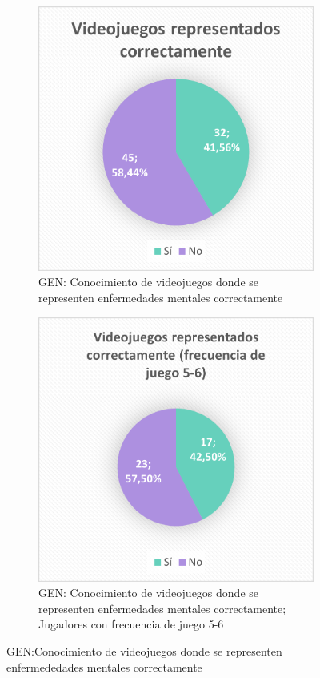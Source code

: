 \documentclass[12pt, a4paper,twoside,titlepage]{book}
\begin{document}
\begin{figure}
	\centering
	\begin{subfigure}{.5\textwidth}
		\centering
		\includegraphics[width=.95\linewidth]{ANEXO Gen/17AnexGENCorr}
		\caption{GEN: Conocimiento de videojuegos donde se representen enfermedades mentales correctamente}
		
	\end{subfigure}%
	\begin{subfigure}{.5\textwidth}
		\centering
		\includegraphics[width=.95\linewidth]{ANEXO Gen/18AnexGENCorr56}
		\caption{GEN: Conocimiento de videojuegos donde se representen enfermedades mentales correctamente; Jugadores con frecuencia de juego 5-6}
		
	\end{subfigure}
	\caption{GEN:Conocimiento de videojuegos donde se representen enfermededades mentales correctamente}
	\label{fig:GENCorrecto}
\end{figure}
\end{document}
